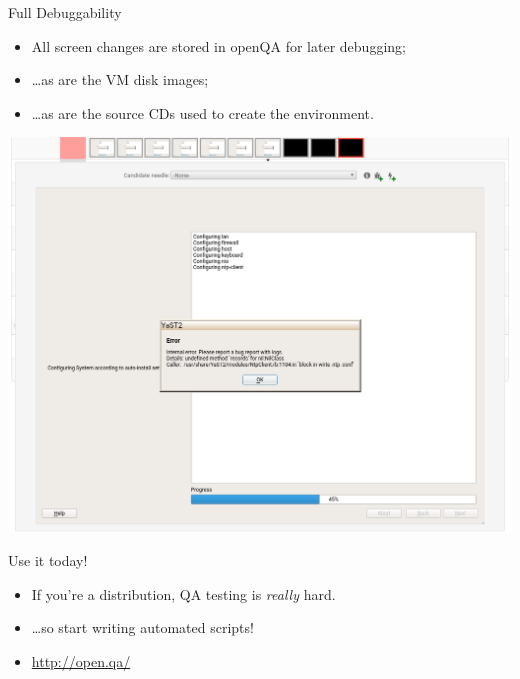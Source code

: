 \documentclass[10pt,aspectratio=169]{beamer}
\begin{document}
	\begin{frame}{Full Debuggability}
		\begin{itemize}
			\item All screen changes are stored in openQA for later debugging;
			\item \dots as are the VM disk images;
			\item \dots as are the source CDs used to create the environment.
		\end{itemize}

		\begin{center}
			\includegraphics[height=0.7\textheight]{openqa_screenshot_prev}
		\end{center}
	\end{frame}

	\begin{frame}{Use it today!}
		\begin{itemize}
			\item If you're a distribution, QA testing is \textit{really} hard.
			\item \dots so start writing automated scripts!
			\item \url{http://open.qa/}
		\end{itemize}
	\end{frame}
\end{document}
